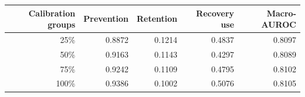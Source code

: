 \begin{tabular}{rrrrr}
\toprule
Calibration groups & Prevention & Retention & Recovery use & Macro-AUROC \\
\midrule
25\% & 0.8872 & 0.1214 & 0.4837 & 0.8097 \\
50\% & 0.9163 & 0.1143 & 0.4297 & 0.8089 \\
75\% & 0.9242 & 0.1109 & 0.4795 & 0.8102 \\
100\% & 0.9386 & 0.1002 & 0.5076 & 0.8105 \\
\bottomrule
\end{tabular}
